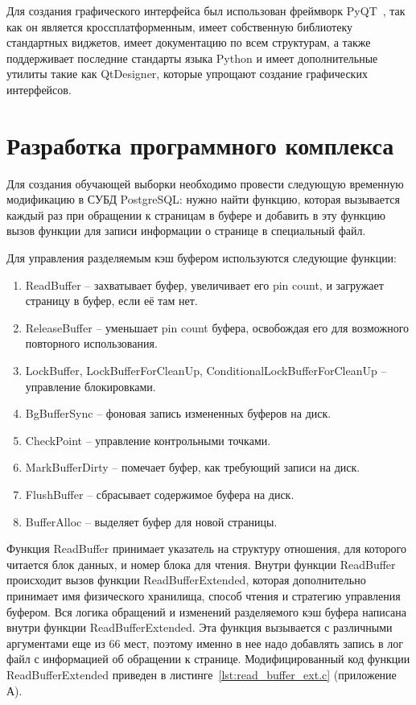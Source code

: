 Для создания графического интерфейса был использован фреймворк PyQT~\cite{qt}, так как он является кроссплатформенным, имеет собственную библиотеку стандартных виджетов, имеет документацию по всем структурам, а также поддерживает последние стандарты языка Python и имеет дополнительные утилиты такие как QtDesigner, которые упрощают создание графических интерфейсов.

\section{Разработка программного комплекса}

Для создания обучающей выборки необходимо провести следующую временную модификацию в СУБД PostgreSQL: нужно найти функцию, которая вызывается каждый раз при обращении к страницам в буфере и добавить в эту функцию вызов функции для записи информации о странице в специальный файл.

Для управления разделяемым кэш буфером используются следующие функции:
\begin{enumerate}
	\item ReadBuffer -- захватывает буфер, увеличивает его pin count, и загружает страницу в буфер, если её там нет.
	\item ReleaseBuffer -- уменьшает pin count буфера, освобождая его для возможного повторного использования.
	\item LockBuffer, LockBufferForCleanUp, ConditionalLockBufferForCleanUp -- управление блокировками.
	\item BgBufferSync -- фоновая запись измененных буферов на диск.
	\item CheckPoint -- управление контрольными точками.
	\item MarkBufferDirty -- помечает буфер, как требующий записи на диск.
	\item FlushBuffer -- сбрасывает содержимое буфера на диск.
	\item BufferAlloc -- выделяет буфер для новой страницы.
\end{enumerate}

Функция ReadBuffer принимает указатель на структуру отношения, для которого читается блок данных, и номер блока для чтения.
Внутри функции ReadBuffer происходит вызов функции ReadBufferExtended, которая дополнительно принимает имя физического хранилища, способ чтения и стратегию управления буфером.
Вся логика обращений и изменений разделяемого кэш буфера написана внутри функции ReadBufferExtended.
Эта функция вызывается с различными аргументами еще из 66 мест, поэтому именно в нее надо добавлять запись в лог файл с информацией об обращении к странице.
Модифицированный код функции ReadBufferExtended приведен в листинге~\ref{lst:read_buffer_ext.c} (приложение А).

